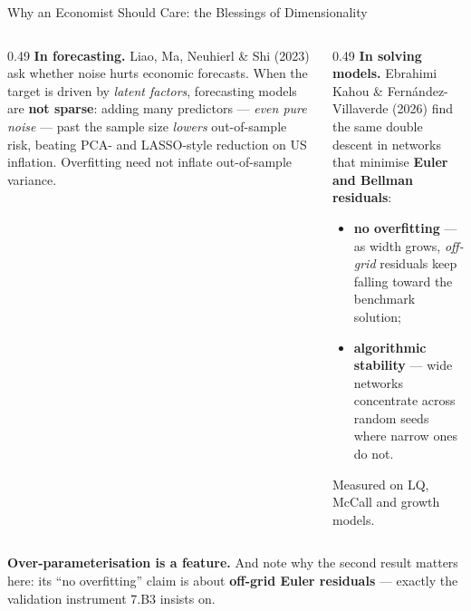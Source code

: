 \begin{frame}{Why an Economist Should Care: the Blessings of Dimensionality}
\begin{columns}[T]
\begin{column}{0.49\textwidth}
\small
\textbf{In forecasting.} Liao, Ma, Neuhierl \& Shi (2023) ask whether noise hurts economic forecasts. When the target is driven by \emph{latent factors}, forecasting models are \textbf{not sparse}: adding many predictors --- \emph{even pure noise} --- past the sample size \emph{lowers} out-of-sample risk, beating PCA- and LASSO-style reduction on US inflation. Overfitting need not inflate out-of-sample variance.
\end{column}
\begin{column}{0.49\textwidth}
\small
\textbf{In solving models.} Ebrahimi Kahou \& Fern\'andez-Villaverde (2026) find the same double descent in networks that minimise \textbf{Euler and Bellman residuals}:
\begin{itemize}\small\setlength{\itemsep}{0.8mm}
  \item \textbf{no overfitting} --- as width grows, \emph{off-grid} residuals keep falling toward the benchmark solution;
  \item \textbf{algorithmic stability} --- wide networks concentrate across random seeds where narrow ones do not.
\end{itemize}
Measured on LQ, McCall and growth models.
\end{column}
\end{columns}
\medskip
\begin{takeawaybox}\footnotesize
\textbf{Over-parameterisation is a feature.} And note why the second result matters here: its ``no overfitting'' claim is about \textbf{off-grid Euler residuals} --- exactly the validation instrument 7.B3 insists on.
\end{takeawaybox}
\end{frame}

